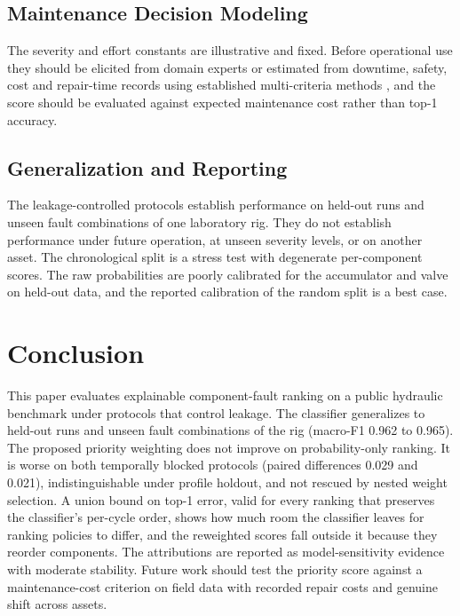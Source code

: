 \documentclass[journal]{IEEEtran}
\begin{document}
\subsection{Maintenance Decision Modeling}

The severity and effort constants are illustrative and fixed. Before operational
use they should be elicited from domain experts or estimated from downtime, safety,
cost and repair-time records using established multi-criteria methods
\cite{Saaty1980AHP,Braglia2000MAFMA,Liu2013FMEAReview}, and the score should be
evaluated against expected maintenance cost rather than top-1 accuracy.

\subsection{Generalization and Reporting}

The leakage-controlled protocols establish performance on held-out runs and unseen
fault combinations of one laboratory rig. They do not establish performance under
future operation, at unseen severity levels, or on another asset. The chronological
split is a stress test with degenerate per-component scores. The raw probabilities are
poorly calibrated for the accumulator and valve on held-out data, and the reported
calibration of the random split is a best case.

\section{Conclusion}
\label{sec:conclusion}

This paper evaluates explainable component-fault ranking on a public hydraulic
benchmark under protocols that control leakage. The classifier generalizes to held-out
runs and unseen fault combinations of the rig (macro-F1 0.962 to 0.965). The proposed
priority weighting does not improve on probability-only ranking. It is worse on both
temporally blocked protocols (paired differences 0.029 and 0.021), indistinguishable
under profile holdout, and not rescued by nested weight selection. A union bound on
top-1 error, valid for every ranking that preserves the classifier's per-cycle order,
shows how much room the classifier leaves for ranking policies to differ, and the
reweighted scores fall outside it because they reorder components. The attributions
are reported as model-sensitivity evidence with moderate stability. Future work should
test the priority score against a maintenance-cost criterion on field data with
recorded repair costs and genuine shift across assets.
\end{document}
